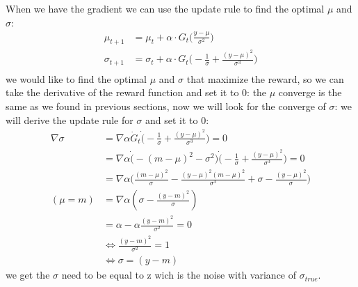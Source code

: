 \documentclass{article}
\begin{document}
    When we have the gradient we can use the update rule to find the optimal $\mu$ and $\sigma$:
    \begin{equation}
        \begin{split}
            \mu_{t+1} &= \mu_t + \alpha \cdot G_t  \Bigg(  \frac{y-\mu}{\sigma^2} \Bigg)\\
            \sigma_{t+1} &= \sigma_t + \alpha \cdot G_t  \Bigg( -\frac{1}{\sigma}+\frac{(y-\mu)^2}{\sigma^3} \Bigg)\\
        \end{split}
    \end{equation}
    we would like to find the optimal $\mu$ and $\sigma$ that maximize the reward, so we can take the derivative of the reward function and set it to 0:
    the $\mu$ converge is the same as we found in previous sections, now we will look for the converge of $\sigma$:
    we will derive the update rule for $\sigma$ and set it to 0:
    \begin{equation}
        \begin{split} 
            \nabla \sigma &= \nabla \alpha \dot G_t \dot (-\frac{1}{\sigma}+\frac{(y-\mu)^2}{\sigma^3}) = 0\\
                          &= \nabla \alpha \dot (-(m-\mu)^2 -\sigma^2) \dot (-\frac{1}{\sigma}+\frac{(y-\mu)^2}{\sigma^3}) = 0\\
                          &= \nabla \alpha \big ( \frac{(m-\mu)^2}{\sigma} - \frac{(y-\mu)^2(m-\mu)^2}{\sigma^3}+\sigma - \frac{(y-\mu)^2}{\sigma}\big)\\
                          (\mu = m)&= \nabla \alpha(\sigma-\frac{(y-m)^2}{\sigma})\\
                          &= \alpha -\alpha \frac{(y-m)^2}{\sigma^2} = 0 \\
                          &\iff \frac{(y-m)^2}{\sigma^2} = 1\\
                          &\iff \sigma = (y-m)
        \end{split}
    \end{equation}
    we get the $\sigma$ need to be equal to z wich is the noise with variance of $\sigma_{true}$.
\end{document}
